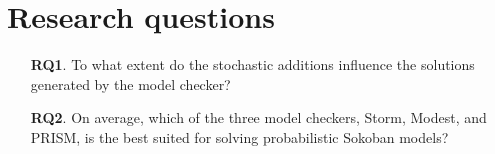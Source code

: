 \section{Research questions}
\begin{enumerate}
    \item[\textbf{RQ1}.] To what extent do the stochastic additions influence the solutions generated by the model checker?
    \item[\textbf{RQ2}.] On average, which of the three model checkers, Storm, Modest, and PRISM, is the best suited for solving probabilistic Sokoban models?
\end{enumerate}